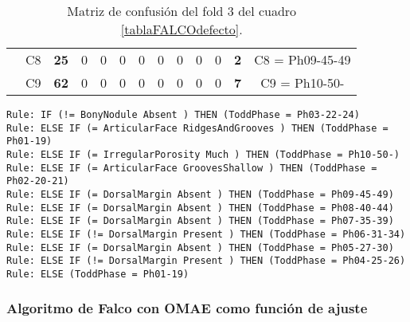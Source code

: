 \begin{table}[]
{\begin{tabular}{|ccccccccccccc|}
\multicolumn{1}{|c|}{}                                      & \multicolumn{1}{c|}{C8} & \multicolumn{1}{c|}{\textbf{25}} & \multicolumn{1}{c|}{0}          & \multicolumn{1}{c|}{0}          & \multicolumn{1}{c|}{0}  & \multicolumn{1}{c|}{0}  & \multicolumn{1}{c|}{0}  & \multicolumn{1}{c|}{0}  & \multicolumn{1}{c|}{0}  & \multicolumn{1}{c|}{0}  & \multicolumn{1}{c|}{\textbf{2}} & C8 = Ph09-45-49   \\ \cline{2-13}
\multicolumn{1}{|c|}{}                                      & \multicolumn{1}{c|}{C9} & \multicolumn{1}{c|}{\textbf{62}} & \multicolumn{1}{c|}{0}          & \multicolumn{1}{c|}{0}          & \multicolumn{1}{c|}{0}  & \multicolumn{1}{c|}{0}  & \multicolumn{1}{c|}{0}  & \multicolumn{1}{c|}{0}  & \multicolumn{1}{c|}{0}  & \multicolumn{1}{c|}{0}  & \multicolumn{1}{c|}{\textbf{7}} & C9 = Ph10-50-     \\ \hline
\end{tabular}%
}
\caption{Matriz de confusión del fold 3 del cuadro \ref{tablaFALCOdefecto}.}
\end{table}



\begin{lstlisting}
Rule: IF (!= BonyNodule Absent ) THEN (ToddPhase = Ph03-22-24)
Rule: ELSE IF (= ArticularFace RidgesAndGrooves ) THEN (ToddPhase = Ph01-19)
Rule: ELSE IF (= IrregularPorosity Much ) THEN (ToddPhase = Ph10-50-)
Rule: ELSE IF (= ArticularFace GroovesShallow ) THEN (ToddPhase = Ph02-20-21)
Rule: ELSE IF (= DorsalMargin Absent ) THEN (ToddPhase = Ph09-45-49)
Rule: ELSE IF (= DorsalMargin Absent ) THEN (ToddPhase = Ph08-40-44)
Rule: ELSE IF (= DorsalMargin Absent ) THEN (ToddPhase = Ph07-35-39)
Rule: ELSE IF (!= DorsalMargin Present ) THEN (ToddPhase = Ph06-31-34)
Rule: ELSE IF (= DorsalMargin Absent ) THEN (ToddPhase = Ph05-27-30)
Rule: ELSE IF (!= DorsalMargin Present ) THEN (ToddPhase = Ph04-25-26)
Rule: ELSE (ToddPhase = Ph01-19)
\end{lstlisting}


\subsubsection{Algoritmo de Falco con OMAE como función de ajuste}

